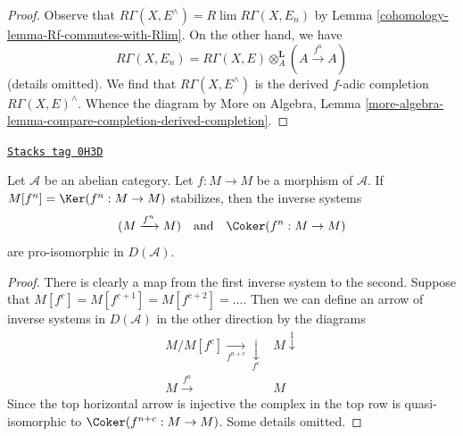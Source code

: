 \begin{proof}

Observe that $R\Gamma(X, E^\wedge) = R\lim R\Gamma(X, E_n)$ by
Lemma \ref{cohomology-lemma-Rf-commutes-with-Rlim}.
On the other hand, we have
$$
R\Gamma(X, E_n) =
R\Gamma(X, E) \otimes_A^\mathbf{L} (A \xrightarrow{f^n} A)
$$
(details omitted). We find that $R\Gamma(X, E^\wedge)$ is the derived
$f$-adic completion $R\Gamma(X, E)^\wedge$. Whence the diagram by
More on Algebra, Lemma
\ref{more-algebra-lemma-compare-completion-derived-completion}.
\end{proof}

\begin{lemma}[Stabilizes]
\label{cohomology-lemma-stabilizes}
\href{https://stacks.math.columbia.edu/tag/0H3D}{\texttt{Stacks tag 0H3D}}

Let $\mathcal{A}$ be an abelian category. Let $f : M \to M$ be a morphism
of $\mathcal{A}$. If $M[f^n] = \Ker(f^n : M \to M)$ stabilizes, then the
inverse systems
$$
(M \xrightarrow{f^n} M)
\quad\text{and}\quad
\Coker(f^n : M \to M)
$$
are pro-isomorphic in $D(\mathcal{A})$.
\end{lemma}

\begin{proof}
There is clearly a map from the first inverse system to the second. Suppose that
$M[f^c] = M[f^{c + 1}] = M[f^{c + 2}] = \ldots$.
Then we can define an arrow of inverse systems in $D(\mathcal{A})$
in the other direction by the diagrams
$$
\begin{array}{cc}M/M[f^c] \underset{f^{n + c}}{\longrightarrow}\underset{f^c}{\downarrow} & M \overset{1}{\downarrow} \\ M \overset{f^n}{\longrightarrow} & M\end{array}
$$
Since the top horizontal arrow is injective the complex
in the top row is quasi-isomorphic to $\Coker(f^{n + c} : M \to M)$.
Some details omitted.
\end{proof}

